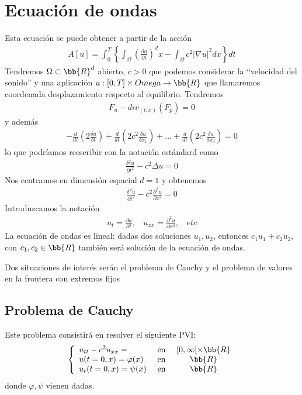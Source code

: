 \chapter{Ecuación de ondas}
Esta ecuación se puede obtener a partir de la acción 
\begin{gather*}
    A[u] = \int_{0}^{T} \left\{ \int_{\Omega} \left(\frac{\partial u}{\partial t}\right)^dx - \int_\Omega c^2 |\nabla u|^2 dx \right\} dt
\end{gather*}
Tendremos $\Omega \subset \bb{R}^d$ abierto, $c>0$ que podemos considerar la ``velocidad del sonido'' y una aplicación $u:[0,T]\times Omega \to \bb{R}$ que llamaremos coordenada desplazamiento respecto al equilibrio. Tendremos 
\begin{gather*}
    F_u - div_{(t,x)} (F_p) = 0
\end{gather*}
y además
\begin{gather*}
    -\frac{d}{dt} \left(2\frac{\delta u}{\delta t}\right) + \frac{d}{dt} \left(2c^2\frac{\delta u}{\delta x_1}\right) + ... + \frac{d}{dt} \left(2c^2\frac{\delta u}{\delta x_d}\right) = 0
\end{gather*}
lo que podríamos reescribir con la notación estándard como 
\begin{gather*}
    \frac{\delta^2u}{\partial t^2} - c^2 \Delta u = 0
\end{gather*}
Nos centramos en dimensión espacial $d=1$ y obtenemos 
\begin{gather*}
    \frac{\delta^2u}{\partial t^2} - c^2 \frac{\partial^2 u}{\partial x^2} = 0
\end{gather*}
Introduzcamos la notación 
\begin{gather*}
    u_t = \frac{\partial u}{\partial t},\ \ \ \ u_{xx} = \frac{\partial ^2u}{\partial x^2},\ \ \ \ etc
\end{gather*}
La ecuación de ondas es lineal: dadas dos soluciones $u_1, u_2$, entonces $c_1u_1 + c_2u_2$, con $c_1,c_2\in \bb{R}$ también será solución de la ecuación de ondas.

Dos situaciones de interés serán el problema de Cauchy y el problema de valores en la frontera con extremos fijos
\section{Problema de Cauchy}
Este problema consistirá en resolver el siguiente PVI:
\begin{gather*}
    \left\{
    \begin{array}{l c c}
        u_{tt} - c^2u_{xx} = & \text{ en } & [0,\infty[\times \bb{R}\\
        u(t=0, x) = \varphi(x) & \text{ en } & \bb{R}\\
        u_t(t=0, x) = \psi(x) & \text{ en } & \bb{R}
    \end{array}
    \right.
\end{gather*}
donde $\varphi, \psi$ vienen dadas.

